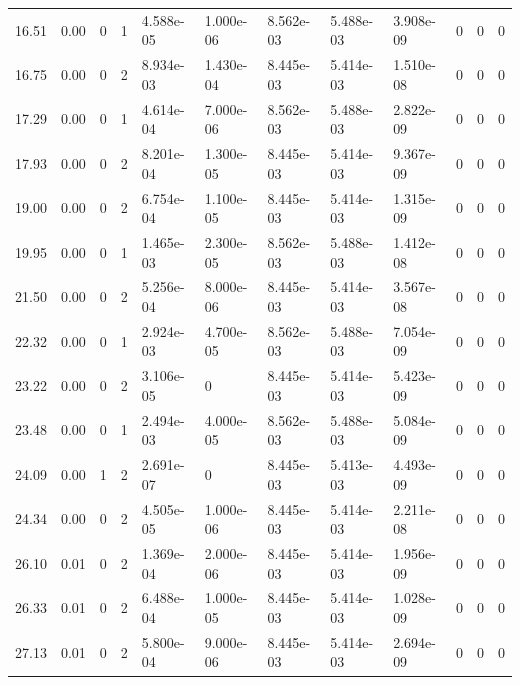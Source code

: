 \documentclass[preview]{standalone}
\begin{document}
{{\begin{tabular}{L{1.2cm}C{1.2cm} C{0.3cm}C{0.5cm} C{1.4cm}C{1.4cm} C{1.4cm}C{1.4cm} C{1.6cm}C{1.6cm} C{1.6cm}C{1.6cm}}
  16.51  &  0.00  & 0     &  1 &  4.588e-05  & 1.000e-06  &  8.562e-03&   5.488e-03& 3.908e-09 & 0   &  0 & 0  \\ 
  16.75  &  0.00  & 0     &  2 &  8.934e-03  & 1.430e-04  &  8.445e-03&   5.414e-03& 1.510e-08 & 0   &  0 & 0  \\ 
  17.29  &  0.00  & 0     &  1 &  4.614e-04  & 7.000e-06  &  8.562e-03&   5.488e-03& 2.822e-09 & 0   &  0 & 0  \\ 
  17.93  &  0.00  & 0     &  2 &  8.201e-04  & 1.300e-05  &  8.445e-03&   5.414e-03& 9.367e-09 & 0   &  0 & 0  \\ 
  19.00  &  0.00  & 0     &  2 &  6.754e-04  & 1.100e-05  &  8.445e-03&   5.414e-03& 1.315e-09 & 0   &  0 & 0  \\ 
  19.95  &  0.00  & 0     &  1 &  1.465e-03  & 2.300e-05  &  8.562e-03&   5.488e-03& 1.412e-08 & 0   &  0 & 0  \\ 
  21.50  &  0.00  & 0     &  2 &  5.256e-04  & 8.000e-06  &  8.445e-03&   5.414e-03& 3.567e-08 & 0   &  0 & 0  \\ 
  22.32  &  0.00  & 0     &  1 &  2.924e-03  & 4.700e-05  &  8.562e-03&   5.488e-03& 7.054e-09 & 0   &  0 & 0  \\ 
  23.22  &  0.00  & 0     &  2 &  3.106e-05  & 0  &  8.445e-03&   5.414e-03& 5.423e-09 & 0   &  0 & 0  \\ 
  23.48  &  0.00  & 0     &  1 &  2.494e-03  & 4.000e-05  &  8.562e-03&   5.488e-03& 5.084e-09 & 0   &  0 & 0  \\ 
  24.09  &  0.00  & 1     &  2 &  2.691e-07  & 0  &  8.445e-03&   5.413e-03& 4.493e-09 & 0   &  0 & 0  \\ 
  24.34  &  0.00  & 0     &  2 &  4.505e-05  & 1.000e-06  &  8.445e-03&   5.414e-03& 2.211e-08 & 0   &  0 & 0  \\ 
  26.10  &  0.01  & 0     &  2 &  1.369e-04  & 2.000e-06  &  8.445e-03&   5.414e-03& 1.956e-09 & 0   &  0 & 0  \\ 
  26.33  &  0.01  & 0     &  2 &  6.488e-04  & 1.000e-05  &  8.445e-03&   5.414e-03& 1.028e-09 & 0   &  0 & 0  \\ 
  27.13  &  0.01  & 0     &  2 &  5.800e-04  & 9.000e-06  &  8.445e-03&   5.414e-03& 2.694e-09 & 0   &  0 & 0  \\ 
\hline 
\end{tabular} 

}}
\end{document}
